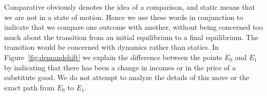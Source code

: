Comparative obviously denotes the idea of a comparison, and static means that we are not in a state of motion. Hence we use these words in conjunction to indicate that we compare one outcome with another, without being concerned too much about the transition from an initial equilibrium to a final equilibrium. The transition would be concerned with dynamics rather than statics. In Figure~\ref{fig:demandshift} we explain the difference between the points $E_0$ and $E_1$ by indicating that there has been a change in incomes or in the price of a substitute good. We do not attempt to analyze the details of this move or the exact path from $E_0$ to $E_1$. 